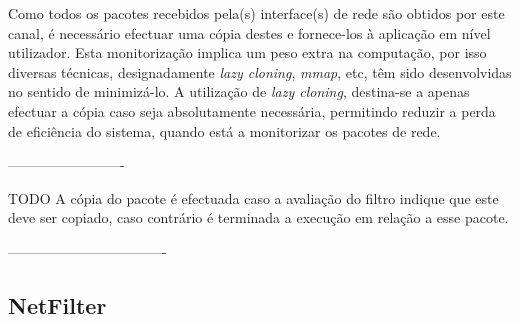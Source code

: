  

Como todos os pacotes recebidos pela(s) interface(s) de rede são obtidos por este canal, é necessário efectuar uma cópia destes e fornece-los à aplicação em nível utilizador.
Esta monitorização implica um peso extra na computação, por isso diversas técnicas, designadamente \textit{lazy cloning}, \textit{mmap}, etc, têm sido desenvolvidas no sentido de minimizá-lo.
A utilização de \textit{lazy cloning}, destina-se a apenas efectuar a cópia caso seja absolutamente necessária, permitindo reduzir a perda de eficiência do sistema, quando está a monitorizar os pacotes de rede.

-------------------------

TODO
A cópia do pacote é efectuada caso a avaliação do filtro indique que este deve ser copiado, caso contrário é terminada a execução em relação a esse pacote.

----------------------------------



\subsection{NetFilter}


